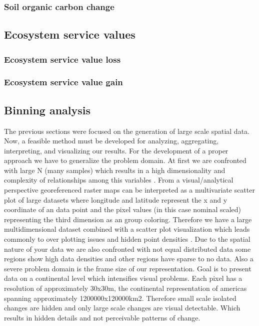 		\subsubsection{Soil organic carbon change}
			\lipsum[1-2]

	\subsection{Ecosystem service values}
		\subsubsection{Ecosystem service value loss}
			\lipsum[1-2]
		\subsubsection{Ecosystem service value gain}
			\lipsum[1]

	\subsection{Binning analysis}
		The previous sections were focused on the generation of large scale spatial data. Now, a feasible method must be developed for analyzing, aggregating, interpreting, and visualizing our results. For the development of a proper approach we have to generalize the problem domain. At first we are confronted with large N (many samples) which results in a high dimensionality and complexity of relationships among this variables \citep{Carr1990}. From a visual/analytical perspective georeferenced raster maps can be interpreted as a multivariate scatter plot of large datasets where longitude and latitude represent the x and y coordinate of an data point and the pixel values (in this case nominal scaled) representing the third dimension as an group coloring. Therefore we have a large multidimensional dataset combined with a scatter plot visualization which leads commonly to over plotting issues and hidden point densities \citep{Carr1987}. Due to the spatial nature of your data we are also confronted with not equal distributed data some regions show high data densities and other regions have sparse to no data. Also a severe problem domain is the frame size of our representation. Goal is to present data on a continental level which intensifies visual problems. Each pixel has a resolution of approximately 30x30m, the continental representation of americas spanning approximately 1200000x120000km2. Therefore small scale isolated changes are hidden and only large scale changes are visual detectable. Which results in hidden details and not perceivable patterns of change.

